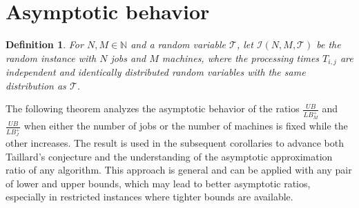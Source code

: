 \documentclass{article}
\theoremstyle{thmstyleone}%
\theoremstyle{thmstyletwo}%
\theoremstyle{thmstylethree}%
\newtheorem{definition}{Definition}%
\begin{document}

\section{Asymptotic behavior}
\label{section:AsymptoticBehavior}

\begin{definition}
For $N, M \in \mathbb{N}$ and a random variable $\mathcal{T}$, let $\mathcal{I}(N, M, \mathcal{T})$ be the random instance with $N$ jobs and $M$ machines, 
where the processing times $T_{i,j}$ are independent and identically distributed random variables with the same distribution as $\mathcal{T}$.
\end{definition}


The following theorem analyzes the asymptotic behavior of the ratios $\frac{UB}{LB_M^+}$ and $\frac{UB}{LB_J^+}$ when either the number of jobs or the number of machines is fixed while the other increases. 
The result is used in the subsequent corollaries to advance both Taillard’s conjecture and the understanding of the asymptotic approximation ratio of any algorithm.
This approach is general and can be applied with any pair of lower and upper bounds, which may lead to better asymptotic ratios, especially in restricted instances where tighter bounds are available. 
\end{document}
